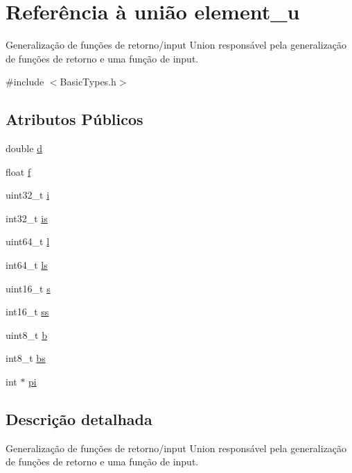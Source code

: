 \hypertarget{unionelement__u}{}\section{Referência à união element\+\_\+u}
\label{unionelement__u}


Generalização de funções de retorno/input Union responsável pela generalização de funções de retorno e uma função de input.  




{\ttfamily \#include $<$Basic\+Types.\+h$>$}

\subsection*{Atributos Públicos}
\begin{DoxyCompactItemize}
\item 
double \hyperlink{unionelement__u_a055cfbd7f84724337a2cb16acdedab90}{d}
\item 
float \hyperlink{unionelement__u_ad3caae754d93e7fa606a0756f5ddc6a6}{f}
\item 
uint32\+\_\+t \hyperlink{unionelement__u_ac1564bf5b02b69382469449ba266dc9a}{i}
\item 
int32\+\_\+t \hyperlink{unionelement__u_a8230539b3b28f57ac3fd61e10c76a740}{is}
\item 
uint64\+\_\+t \hyperlink{unionelement__u_aca3c96df160bc775791470b98e15710f}{l}
\item 
int64\+\_\+t \hyperlink{unionelement__u_af52b13fa38bfc4e5a98d4b868324ee27}{ls}
\item 
uint16\+\_\+t \hyperlink{unionelement__u_a85c036f57770aeab7ed90947ffdfda53}{s}
\item 
int16\+\_\+t \hyperlink{unionelement__u_ab90ee55202fd11a2dc3cf48c74e55dab}{ss}
\item 
uint8\+\_\+t \hyperlink{unionelement__u_a53d82c8469f011fdb1e35f88738aaf5e}{b}
\item 
int8\+\_\+t \hyperlink{unionelement__u_ae2cf2a77222a37a817fba0e70266ddf6}{bs}
\item 
int $\ast$ \hyperlink{unionelement__u_a3c7acdaf4dc01ef8694967376100fc8f}{pi}
\end{DoxyCompactItemize}


\subsection{Descrição detalhada}
Generalização de funções de retorno/input Union responsável pela generalização de funções de retorno e uma função de input. 

